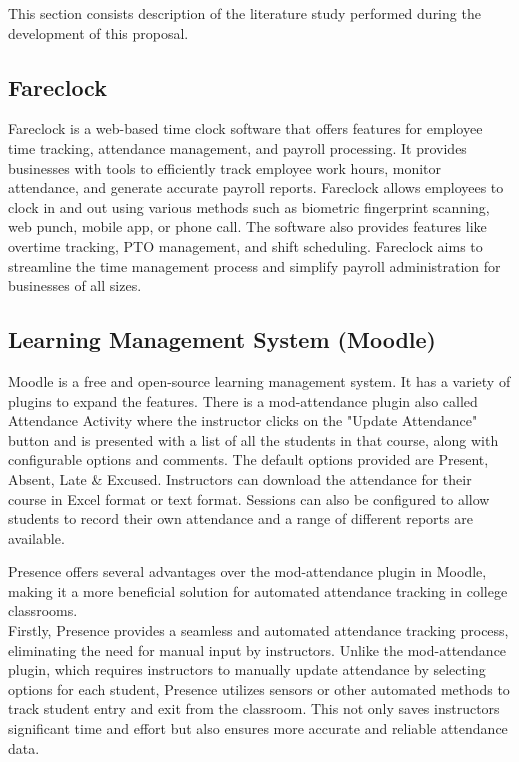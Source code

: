 This section consists description of the literature study performed during the development of this proposal.

\subsection{Fareclock}
Fareclock\cite{fareclock} is a web-based time clock software that offers features for employee time tracking, attendance management, and payroll processing. It provides businesses with tools to efficiently track employee work hours, monitor attendance, and generate accurate payroll reports. Fareclock allows employees to clock in and out using various methods such as biometric fingerprint scanning, web punch, mobile app, or phone call. The software also provides features like overtime tracking, PTO management, and shift scheduling. Fareclock aims to streamline the time management process and simplify payroll administration for businesses of all sizes.

\subsection{Learning Management System (Moodle)}

Moodle is a free and open-source learning management system. It has a variety of plugins to expand the features. There is a mod-attendance\cite{moodle_attendance} plugin also called Attendance Activity\cite{moodle_activity} where the instructor clicks on the "Update Attendance" button and is presented with a list of all the students in that course, along with configurable options and comments. The default options provided are Present, Absent, Late & Excused. Instructors can download the attendance for their course in Excel format or text format. Sessions can also be configured to allow students to record their own attendance and a range of different reports are available.

Presence offers several advantages over the mod-attendance plugin in Moodle, making it a more beneficial solution for automated attendance tracking in college classrooms.\\

Firstly, Presence provides a seamless and automated attendance tracking process, eliminating the need for manual input by instructors. Unlike the mod-attendance plugin, which requires instructors to manually update attendance by selecting options for each student, Presence utilizes sensors or other automated methods to track student entry and exit from the classroom. This not only saves instructors significant time and effort but also ensures more accurate and reliable attendance data.\\

